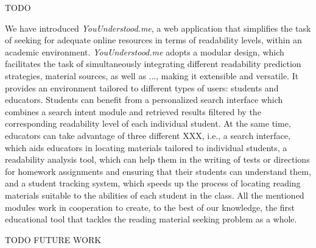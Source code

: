 \documentclass{sig-alternate-05-2015}
\begin{document}
TODO

We have introduced \textit{YouUnderstood.me}, a web application that simplifies the task of seeking for adequate online resources in terms of readability levels, within an academic environment. \textit{YouUnderstood.me} adopts a modular design, which facilitates the task of simultaneously integrating different readability prediction strategies, material sources, as well as ..., making it extensible and versatile. It provides an environment tailored to different types of users: students and educators. Students can benefit from a personalized search interface which combines a search intent module and retrieved results filtered by the corresponding readability level %
of each individual student. At the same time, educators can take advantage of three different XXX, i.e., a search interface, which aids educators in locating materials tailored to individual students, a readability analysis tool, which can help them in the writing of tests or directions for homework assignments and ensuring that their students can understand them, and a student tracking system,  which speeds up the process of locating reading materials suitable to the abilities of each student in the class. All the mentioned modules work in cooperation to create, to the best of our knowledge, the first educational tool that tackles the reading material seeking problem as a whole.

TODO FUTURE WORK













{}

\nocite{*}
\end{document}
